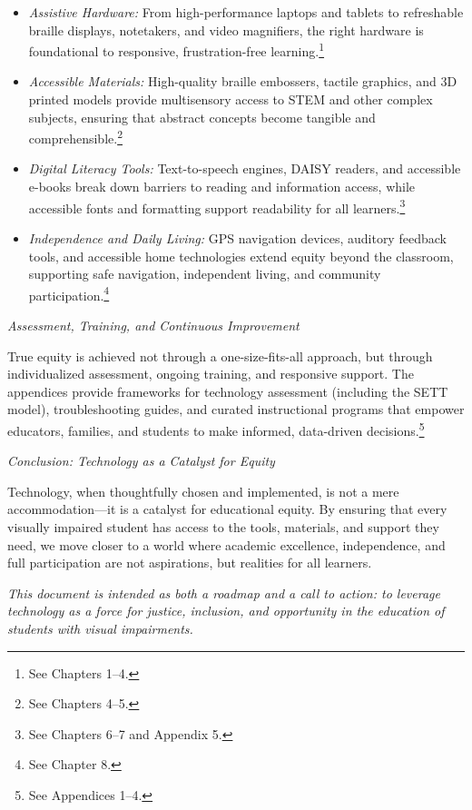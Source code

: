 \begin{itemize}
    \item \emph{Assistive Hardware:} From high-performance laptops and tablets to refreshable braille displays, notetakers, and video magnifiers, the right hardware is foundational to responsive, frustration-free learning.\footnote{See Chapters 1–4.}
    \item \emph{Accessible Materials:} High-quality braille embossers, tactile graphics, and 3D printed models provide multisensory access to STEM and other complex subjects, ensuring that abstract concepts become tangible and comprehensible.\footnote{See Chapters 4–5.}
    \item \emph{Digital Literacy Tools:} Text-to-speech engines, DAISY readers, and accessible e-books break down barriers to reading and information access, while accessible fonts and formatting support readability for all learners.\footnote{See Chapters 6–7 and Appendix 5.}
    \item \emph{Independence and Daily Living:} GPS navigation devices, auditory feedback tools, and accessible home technologies extend equity beyond the classroom, supporting safe navigation, independent living, and community participation.\footnote{See Chapter 8.}
\end{itemize}

\emph{Assessment, Training, and Continuous Improvement}

True equity is achieved not through a one-size-fits-all approach, but through individualized assessment, ongoing training, and responsive support. The appendices provide frameworks for technology assessment (including the SETT model), troubleshooting guides, and curated instructional programs that empower educators, families, and students to make informed, data-driven decisions.\footnote{See Appendices 1–4.}

\emph{Conclusion: Technology as a Catalyst for Equity}

Technology, when thoughtfully chosen and implemented, is not a mere accommodation—it is a catalyst for educational equity. By ensuring that every visually impaired student has access to the tools, materials, and support they need, we move closer to a world where academic excellence, independence, and full participation are not aspirations, but realities for all learners.

\bigskip

\noindent\textit{This document is intended as both a roadmap and a call to action: to leverage technology as a force for justice, inclusion, and opportunity in the education of students with visual impairments.}
